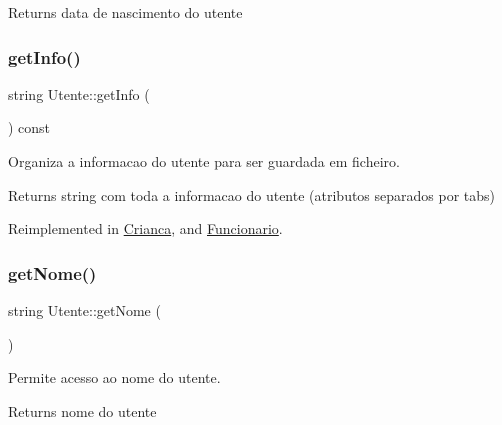 \begin{DoxyReturn}{Returns}
data de nascimento do utente 
\end{DoxyReturn}
\mbox{\label{class_utente_aee03eae2a7154e7b4713b2be195d548f}} 
\subsubsection{\texorpdfstring{get\+Info()}{getInfo()}}
{\footnotesize\ttfamily string Utente\+::get\+Info (\begin{DoxyParamCaption}{ }\end{DoxyParamCaption}) const\hspace{0.3cm}{\ttfamily [virtual]}}



Organiza a informacao do utente para ser guardada em ficheiro. 

\begin{DoxyReturn}{Returns}
string com toda a informacao do utente (atributos separados por tabs) 
\end{DoxyReturn}


Reimplemented in \mbox{\hyperlink{class_crianca_a7cd065415f6f0a2802ca2d37a3a7cc25}{Crianca}}, and \mbox{\hyperlink{class_funcionario_a3cafb55c689dcb260975d3083cef1a98}{Funcionario}}.

\mbox{\label{class_utente_a56bf08dbd5fb7fd208421cae1105d9e4}} 
\subsubsection{\texorpdfstring{get\+Nome()}{getNome()}}
{\footnotesize\ttfamily string Utente\+::get\+Nome (\begin{DoxyParamCaption}{ }\end{DoxyParamCaption})}



Permite acesso ao nome do utente. 

\begin{DoxyReturn}{Returns}
nome do utente 
\end{DoxyReturn}
\mbox{\label{class_utente_a02e1b87d26c3770a70e01ecdc7cf87f2}} 
